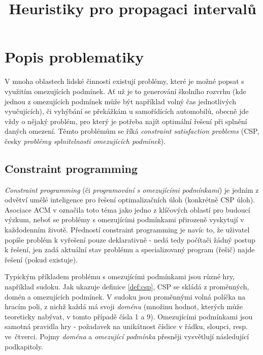 \documentclass[thesis=B,czech]{FITthesis}[2012/06/26]
\title{Heuristiky pro propagaci intervalů}
\theoremstyle{definition}
\begin{document}

\begin{introduction}

\end{introduction}

\chapter{Popis problematiky}
V mnoha oblastech lidské činnosti existují problémy, které je možné popsat s využitím omezujících podmínek. Ať už je to generování školního rozvrhu (kde jednou z omezujících podmínek může být například volný čas jednotlivých vyučujících), či vyhýbání se překážkám u samořídících automobilů, obecně jde vždy o nějaký problém, pro který je potřeba najít optimální řešení při splnění daných omezení. Těmto problémům se říká \emph{constraint satisfaction problems} (CSP, česky \emph{problémy splnitelnosti omezujících podmínek}).

\section{Constraint programming}
\emph{Constraint programming} (či \emph{programování s omezujícími podmínkami}) je jedním z odvětví umělé inteligence pro řešení optimalizačních úloh (konkrétně CSP úloh). Asociace ACM v \cite{Wegner1996} označila toto téma jako jedno z klíčových oblastí pro budoucí výzkum, neboť se problémy s omezujícími podmínkami přirozeně vyskytují v každodenním životě. Předností constraint programming je navíc to, že uživatel popíše problém k vyřešení pouze deklarativně - nedá tedy počítači žádný postup k řešení, jen zadá aktuální stav problému a specializovaný program (řešič) najde řešení (pokud existuje).

Typickým příkladem problému s omezujícími podmínkami jsou různé hry, například sudoku. Jak ukazuje definice \ref{def:csp}, CSP se skládá z proměnných, domén a omezujících podmínek. V sudoku jsou proměnnými volná políčka na hracím poli, z nichž každá má svoji \emph{doménu} (množinu hodnot, kterých může teoreticky nabývat, v tomto případě čísla 1 a 9). Omezujícími podmínkami jsou samotná pravidla hry - požadavek na unikátnost číslice v řádku, sloupci, resp. ve~čtverci. Pojmy \emph{doména} a \emph{omezující podmínka} přesněji vysvětlují následující podkapitoly.
\end{document}

